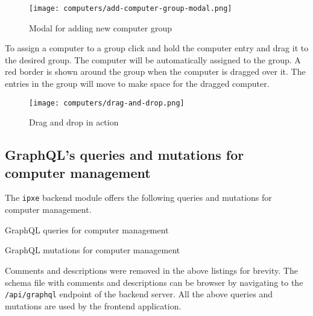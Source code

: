 \documentclass[../main.tex]{subfiles}
\begin{document}
\begin{figure}[H]
  \centering
  \texttt{[image: computers/add-computer-group-modal.png]}
  \caption{Modal for adding new computer group}
\end{figure}

To assign a computer to a group click and hold the computer entry and drag it to the desired group. The computer will be automatically assigned to the group.
A red border is shown around the group when the computer is dragged over it. The entries in the group will move to make space for the dragged computer.

\begin{figure}[H]
  \centering
  \texttt{[image: computers/drag-and-drop.png]}
  \caption{Drag and drop in action}
\end{figure}

\subsection{GraphQL's queries and mutations for computer management}

The \texttt{ipxe} backend module offers the following queries and mutations for computer management.

\begin{listing}[H]
  \caption{GraphQL queries for computer management}
\end{listing}

\begin{listing}[H]
  \caption{GraphQL mutations for computer management}
\end{listing}

Comments and descriptions were removed in the above listings for brevity. The schema file with comments and descriptions can
be browser by navigating to the \texttt{/api/graphql} endpoint of the backend server. All the above queries and mutations
are used by the frontend application.
\end{document}
